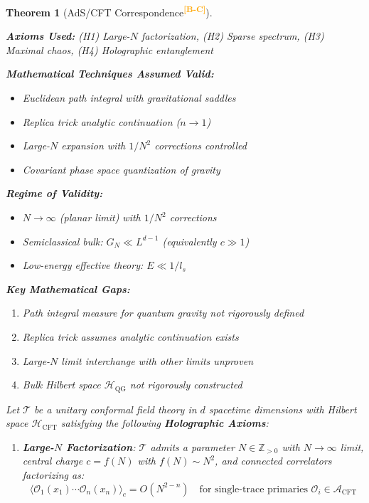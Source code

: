 \documentclass[12pt,a4paper]{article}
\newtheorem{theorem}{Theorem}[section]
\newcommand{\levelBC}{\textsuperscript{\textcolor{orange}{\textbf{[B-C]}}}}
\begin{document}
\begin{theorem}[AdS/CFT Correspondence\levelBC]\label{thm:adscft-main}

\begin{assumptionbox}
\textbf{Axioms Used:} (H1) Large-$N$ factorization, (H2) Sparse spectrum, (H3) Maximal chaos, (H4) Holographic entanglement

\textbf{Mathematical Techniques Assumed Valid:}
\begin{itemize}
    \item Euclidean path integral with gravitational saddles
    \item Replica trick analytic continuation ($n \to 1$)
    \item Large-$N$ expansion with $1/N^2$ corrections controlled
    \item Covariant phase space quantization of gravity
\end{itemize}

\textbf{Regime of Validity:} 
\begin{itemize}
    \item $N \to \infty$ (planar limit) with $1/N^2$ corrections
    \item Semiclassical bulk: $G_N \ll L^{d-1}$ (equivalently $c \gg 1$)
    \item Low-energy effective theory: $E \ll 1/l_s$
\end{itemize}

\textbf{Key Mathematical Gaps:}
\begin{enumerate}
    \item Path integral measure for quantum gravity not rigorously defined
    \item Replica trick assumes analytic continuation exists
    \item Large-$N$ limit interchange with other limits unproven
    \item Bulk Hilbert space $\mathcal{H}_{\text{QG}}$ not rigorously constructed
\end{enumerate}
\end{assumptionbox}

Let $\mathcal{T}$ be a unitary conformal field theory in $d$ spacetime dimensions with Hilbert space $\mathcal{H}_{\text{CFT}}$ satisfying the following \textbf{Holographic Axioms}:
\begin{enumerate}[label=\textbf{(H\arabic*)}]
    \item \textbf{Large-$N$ Factorization}: $\mathcal{T}$ admits a parameter $N \in \mathbb{Z}_{>0}$ with $N \to \infty$ limit, central charge $c = f(N)$ with $f(N) \sim N^2$, and connected correlators factorizing as:
    \begin{equation}
    \langle \mathcal{O}_1(x_1) \cdots \mathcal{O}_n(x_n) \rangle_c = O(N^{2-n}) \quad \text{for single-trace primaries } \mathcal{O}_i \in \mathcal{A}_{\text{CFT}}
    \end{equation}
    

\end{enumerate}
\end{theorem}
\end{document}

